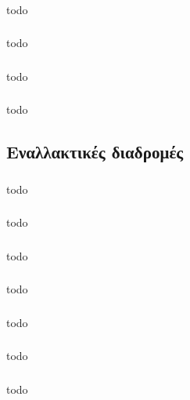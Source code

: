 \documentclass[a4paper, 12pt]{article}
\begin{document}
		\subsubsection{}
			todo

		\subsubsection{}
			todo

		\subsubsection{}
			todo

		\subsubsection{}
			todo

	\subsection{Εναλλακτικές διαδρομές}

		\subsubsection{}
			todo

		\subsubsection{}
			todo

		\subsubsection{}
			todo

		\subsubsection{}
			todo

		\subsubsection{}
			todo

		\subsubsection{}
			todo

		\subsubsection{}
			todo
\end{document}
